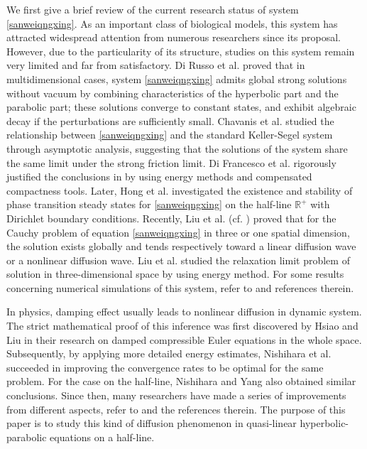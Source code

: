 \documentclass[11pt]{article}
\theoremstyle{plain}
\numberwithin{equation}{section}
\begin{document}
We first give a brief review of the current research status of system \eqref{sanweiqngxing}. 
As an important class of biological models, this system has attracted widespread attention from numerous researchers since its proposal. 
However, due to the particularity of its structure, studies on this system remain very limited and far from satisfactory. 
Di Russo et al. \cite{Russo1,Russo2} proved that in multidimensional cases, system \eqref{sanweiqngxing} admits global strong solutions without vacuum by combining characteristics of the hyperbolic part and the parabolic part; these solutions converge to constant states, and exhibit algebraic decay if the perturbations are sufficiently small. 
Chavanis et al. \cite{sire} studied the relationship between \eqref{sanweiqngxing} and the standard Keller-Segel system through asymptotic analysis, suggesting that the solutions of the system share the same limit under the strong friction limit. 
Di Francesco et al. \cite{Frances} rigorously justified the conclusions in \cite{sire} by using energy methods and compensated compactness tools. 
Later, Hong et al. \cite{ZAwang2} investigated the existence and stability of phase transition steady states for \eqref{sanweiqngxing} on the half-line $\mathbb{R}^+$ with Dirichlet boundary conditions. 
Recently, Liu et al. (cf. \cite{Dong,QQL,Liu-Peng-wang-2022}) proved that for the Cauchy problem of equation \eqref{sanweiqngxing} in three or one spatial dimension, the solution exists globally and tends respectively toward a linear diffusion wave or a nonlinear diffusion wave. Liu et al. \cite{Liu-Peng-wang-2024} studied the relaxation limit problem of solution in three-dimensional space by using energy method.
For some results concerning numerical simulations of this system, refer to \cite{CCCC, cwshu, yalihanshujiashe,ZAwang1} and references therein.


In physics, damping effect usually leads to nonlinear diffusion in dynamic system. The strict mathematical proof of this inference was first discovered by Hsiao and Liu \cite{Hsiao-Liu1992} in their research on damped compressible Euler equations in the whole space. Subsequently, by applying more detailed energy estimates, Nishihara et al. \cite{Nishihara1996, Nishihara2000}  succeeded in improving the convergence rates to be optimal for the same problem. 
For the case on the half-line, Nishihara and Yang \cite{Nishihara-Yang1999} also obtained similar conclusions. Since then,  many researchers have made a series of improvements from different aspects, refer to \cite{Huang-Marcati-Pan2005, Zhu-Jiang2009, Luo2016,Marcati-Mei2000,Matsumura-Nishihara2023,Mei2005,Mei2010, Zhang2023} and the references therein. 
The purpose of this paper is to study this kind of diffusion phenomenon in quasi-linear hyperbolic-parabolic equations on a half-line.
\end{document}
